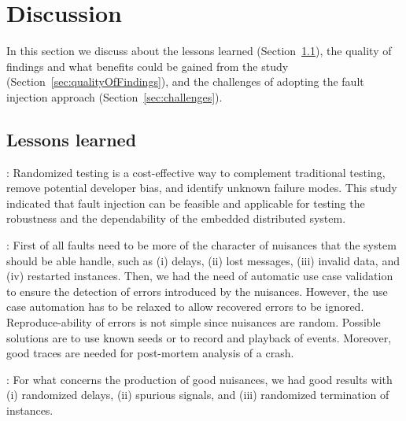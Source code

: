 
\section{Discussion}\label{sec:discussion}

In this section we discuss about the %
lessons learned (Section~\ref{sec:lessonslearned}), the quality of findings and what benefits could be gained from the study (Section~\ref{sec:qualityOfFindings}), and the 
challenges of adopting the fault injection approach (Section~\ref{sec:challenges}). %

\subsection{Lessons learned}\label{sec:lessonslearned}

: Randomized testing is a cost-effective way to complement traditional testing, remove potential  developer bias, and identify unknown failure modes. This study indicated that fault injection can be feasible and applicable for testing the robustness and the dependability of the embedded distributed system. %

: First of all faults need to be more of the character of nuisances that the system should be able handle, such as (i) delays, (ii) lost messages, (iii) invalid data, and (iv) restarted instances. Then, we had the need of automatic use case validation to ensure the detection of errors introduced by the nuisances. However, the use case automation has to be relaxed to allow recovered errors to be ignored.
Reproduce-ability of errors is not simple since nuisances are random. Possible solutions are to use known seeds or to record and playback of events. Moreover, good traces are needed for post-mortem analysis of a crash. 

: For what concerns the production of good nuisances, we had good results with (i) randomized delays, (ii) spurious signals, and (iii) randomized termination of instances. 


